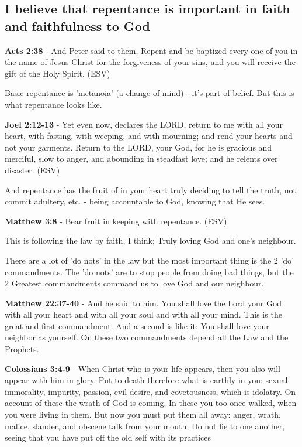 \documentclass[11pt]{article}
\begin{document}
\subsection{I believe that repentance is important in faith and faithfulness to God}
\label{sec:orgd338ae3}
\textbf{Acts 2:38} - And Peter said to them, Repent and be baptized every one of you in the name of Jesus Christ for the forgiveness of your sins, and you will receive the gift of the Holy Spirit. (ESV)

Basic repentance is 'metanoia' (a change of mind) - it's part of belief.
But this is what repentance looks like.

\textbf{Joel 2:12-13} - Yet even now, declares the LORD, return to me with all your heart, with fasting, with weeping, and with mourning; and rend your hearts and not your garments. Return to the LORD, your God, for he is gracious and merciful, slow to anger, and abounding in steadfast love; and he relents over disaster. (ESV)

And repentance has the fruit of in your heart truly deciding to tell the truth, not commit adultery, etc. - being accountable to God, knowing that He sees.

\textbf{Matthew 3:8} - Bear fruit in keeping with repentance. (ESV)

This is following the law by faith, I think; Truly loving God and one's neighbour.

There are a lot of 'do nots' in the law but the most important thing is the 2 'do' commandments.
The 'do nots' are to stop people from doing bad things, but the 2 Greatest commandments command us to love God and our neighbour.

\textbf{Matthew 22:37-40} - And he said to him, You shall love the Lord your God with all your heart and with all your soul and with all your mind. This is the great and first commandment. And a second is like it: You shall love your neighbor as yourself. On these two commandments depend all the Law and the Prophets.

\textbf{Colossians 3:4-9} - When Christ who is your life appears, then you also will appear with him in glory. Put to death therefore what is earthly in you: sexual immorality, impurity, passion, evil desire, and covetousness, which is idolatry. On account of these the wrath of God is coming. In these you too once walked, when you were living in them. But now you must put them all away: anger, wrath, malice, slander, and obscene talk from your mouth. Do not lie to one another, seeing that you have put off the old self with its practices
\end{document}
